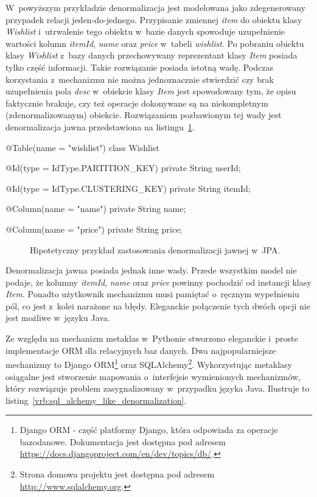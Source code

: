 W~powyższym przykładzie denormalizacja jest modelowana jako zdegenerowany przypadek relacji jeden-do-jednego. Przypisanie zmiennej \emph{item} do obiektu klasy \emph{Wishlist} i~utrwalenie tego obiektu w~bazie danych spowoduje uzupełnienie wartości kolumn \emph{itemId}, \emph{name} oraz \emph{price} w~tabeli \emph{wishlist}. Po pobraniu obiektu klasy \emph{Wishlist} z~bazy danych przechowywany reprezentant klasy \emph{Item} posiada tylko część informacji. Takie rozwiązanie posiada istotną wadę. Podczas korzystania z~mechanizmu nie można jednoznacznie stwierdzić czy brak uzupełnienia pola \emph{desc} w~obiekcie klasy \emph{Item} jest spowodowany tym, że opisu faktycznie brakuje, czy też operacje dokonywane są na niekompletnym (zdenormalizowanym) obiekcie. Rozwiązaniem pozbawionym tej wady jest denormalizacja jawna przedstawiona na listingu~\ref{vrb:jpa_explicit_denormalization_theory}.

\begin{verbbox}
	@Table(name = "wishlist")
	class Wishlist {
	    @Id(type = IdType.PARTITION_KEY) 
	    private String userId;

	    @Id(type = IdType.CLUSTERING_KEY)
	    private String itemId;

	    @Column(name = "name")
	    private String name;

	    @Column(name = "price")
	    private String price;
	}
\end{verbbox}

\begin{figure}[ht!]
	\centering
	\theverbbox
	\caption{Hipotetyczny przykład zastosowania denormalizacji jawnej w~JPA.}
	\label{vrb:jpa_explicit_denormalization_theory}
\end{figure}

Denormalizacja jawna posiada jednak inne wady. Przede wszystkim model nie podaje, że kolumny \emph{itemId}, \emph{name} oraz \emph{price} powinny pochodzić od instancji klasy \emph{Item}. Ponadto użytkownik mechanizmu musi pamiętać o~ręcznym wypełnieniu pól, co jest z~kolei narażone na błędy. Eleganckie połączenie tych dwóch opcji nie jest możliwe w~języku Java. 

Ze względu na mechanizm metaklas w~Pythonie stworzono eleganckie i~proste implementacje ORM dla relacyjnych baz danych. Dwa najpopularniejsze mechanizmy to Django ORM\footnote{Django ORM - część platformy Django, która odpowiada za operacje bazodanowe. Dokumentacja jest dostępna pod adresem \url{https://docs.djangoproject.com/en/dev/topics/db/}.} oraz SQLAlchemy\footnote{Strona domowa projektu jest dostępna pod adresem \url{http://www.sqlalchemy.org}.}. Wykorzystując metaklasy osiągalne jest stworzenie mapowania o~interfejsie wymienionych mechanizmów, który rozwiązuje problem zasygnalizowany w~przypadku języka Java. Ilustruje to listing~\ref{vrb:sql_alchemy_like_denormalization}.

